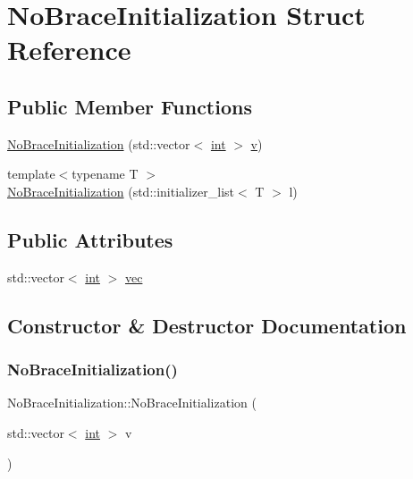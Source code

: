 \hypertarget{struct_no_brace_initialization}{}\section{No\+Brace\+Initialization Struct Reference}
\label{struct_no_brace_initialization}
\subsection*{Public Member Functions}
\begin{DoxyCompactItemize}
\item 
\mbox{\hyperlink{struct_no_brace_initialization_a429862bee36828e20af435d8ecddb4a9}{No\+Brace\+Initialization}} (std\+::vector$<$ \mbox{\hyperlink{warnings_8h_a74f207b5aa4ba51c3a2ad59b219a423b}{int}} $>$ \mbox{\hyperlink{_s_d_l__opengl_8h_a10a82eabcb59d2fcd74acee063775f90}{v}})
\item 
{\footnotesize template$<$typename T $>$ }\\\mbox{\hyperlink{struct_no_brace_initialization_a5879859223c8d45a7afddd9abbed0289}{No\+Brace\+Initialization}} (std\+::initializer\+\_\+list$<$ T $>$ l)
\end{DoxyCompactItemize}
\subsection*{Public Attributes}
\begin{DoxyCompactItemize}
\item 
std\+::vector$<$ \mbox{\hyperlink{warnings_8h_a74f207b5aa4ba51c3a2ad59b219a423b}{int}} $>$ \mbox{\hyperlink{struct_no_brace_initialization_a2671bf72ded90c5c4647cc5e1e3bec04}{vec}}
\end{DoxyCompactItemize}


\subsection{Constructor \& Destructor Documentation}
\mbox{\label{struct_no_brace_initialization_a429862bee36828e20af435d8ecddb4a9}} 
\subsubsection{\texorpdfstring{NoBraceInitialization()}{NoBraceInitialization()}\hspace{0.1cm}{\footnotesize\ttfamily [1/2]}}
{\footnotesize\ttfamily No\+Brace\+Initialization\+::\+No\+Brace\+Initialization (\begin{DoxyParamCaption}\item[{std\+::vector$<$ \mbox{\hyperlink{warnings_8h_a74f207b5aa4ba51c3a2ad59b219a423b}{int}} $>$}]{v }\end{DoxyParamCaption})\hspace{0.3cm}{\ttfamily [inline]}}

